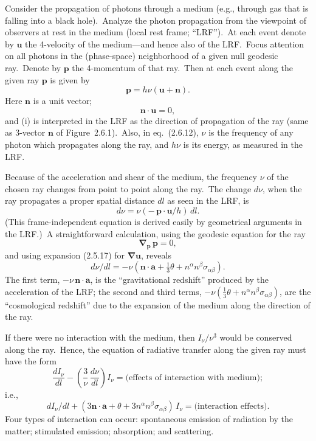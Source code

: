 Consider the propagation of photons through a medium (e.g., through gas that
is falling into a black hole).\ Analyze the photon propagation from the viewpoint
of observers at rest in the medium (local rest frame; ``LRF'').\ At each event
denote by $\mathbf{u}$ the 4-velocity of the medium---and hence also of the LRF.\ Focus
attention on all photons in the (phase-space) neighborhood of a given null
geodesic ray.\ Denote by $\mathbf{p}$ the 4-momentum of that ray.\ Then at each event
along the given ray $\mathbf{p}$ is given by
%
\begin{equation}
\mathbf{p} = h\nu(\mathbf{u} + \mathbf{n}).
\tag{2.6.12}
\end{equation}
%
Here $\mathbf{n}$ is a unit vector;
%
\[
\mathbf{n} \cdot \mathbf{u} = 0,
\]
%
and (i) is interpreted in the LRF as the direction of propagation of the ray
(same as 3-vector $\mathbf{n}$ of Figure~2.6.1).\ Also, in eq.~(2.6.12), $\nu$ is the frequency of
any photon which propagates along the ray, and $h\nu$ is its energy, as measured in
the LRF.

Because of the acceleration and shear of the medium, the frequency
$\nu$ of the chosen ray changes from point to point along the ray.\ The change $d\nu$,
when the ray propagates a proper spatial distance $dl$ as seen in the LRF, is
%
\begin{equation}
d\nu = \nu(-\,\mathbf{p} \cdot \mathbf{u}/h)\,dl.
\tag{2.6.13}
\end{equation}
%
(This frame-independent equation is derived easily by geometrical arguments
in the LRF.)\ A straightforward calculation, using the geodesic equation for the
ray
%
\[
\boldsymbol{\nabla}_{\mathbf{p}}\,\mathbf{p} = 0,
\]
%
and using expansion (2.5.17) for $\boldsymbol{\nabla}\mathbf{u}$, reveals
%
\begin{equation}
d\nu/dl = -\nu(\mathbf{n} \cdot \mathbf{a} + \tfrac{1}{3}\theta
  + n^\alpha n^\beta \sigma_{\alpha\beta}).
\tag{2.6.14}
\end{equation}
%
The first term, $-\nu\,\mathbf{n} \cdot \mathbf{a}$, is the ``gravitational redshift'' produced by the acceleration
of the LRF; the second and third terms, $-\nu(\tfrac{1}{3}\theta + n^\alpha n^\beta \sigma_{\alpha\beta})$, are the
``cosmological redshift'' due to the expansion of the medium along the direction
of the ray.

If there were no interaction with the medium, then $I_\nu/\nu^3$ would be conserved
along the ray.\ Hence, the equation of radiative transfer along the given ray must
have the form
%
\begin{equation}
\frac{dI_\nu}{dl} - \left(\frac{3}{\nu}\,\frac{d\nu}{dl}\right) I_\nu
  = \text{(effects of interaction with medium)};
\tag{2.6.15}
\end{equation}
%
i.e.,
%
\[
dI_\nu/dl + (3\mathbf{n} \cdot \mathbf{a} + \theta
  + 3n^\alpha n^\beta \sigma_{\alpha\beta})\,I_\nu
  = \text{(interaction effects)}.
\]
%
Four types of interaction can occur: spontaneous emission of radiation by the
matter; stimulated emission; absorption; and scattering.

